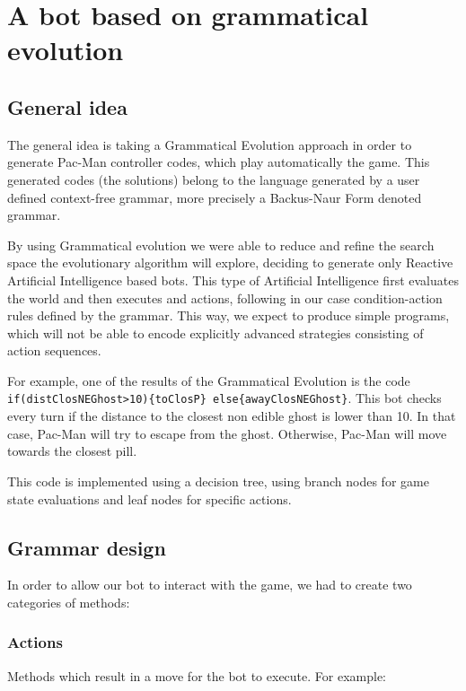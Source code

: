 \documentclass{llncs}
\newcommand{\paco}{Pac-Man }
\begin{document}
%
\section{A bot based on grammatical evolution}
\label{sec:sec1}
%

\subsection{General idea}

The general idea is taking a Grammatical Evolution approach in order to generate \paco controller codes, which play automatically the game. This generated codes (the solutions) belong to the language generated by a user defined context-free grammar, more precisely a Backus-Naur Form denoted grammar.\cite{o'neill_ryan_2012} 

By using Grammatical evolution we were able to reduce and refine the search space the evolutionary algorithm will explore, deciding to generate only Reactive Artificial Intelligence based bots. This type of Artificial Intelligence first evaluates the world and then executes and actions, following in our case condition-action rules defined by the grammar. This way, we expect to produce simple programs, which will not be able to encode explicitly advanced strategies consisting of action sequences.

For example, one of the results of the Grammatical Evolution is the code \texttt{if(distClosNEGhost>10)\{toClosP\} else\{awayClosNEGhost\}}. This bot checks every turn if the distance to the closest non edible ghost is lower than 10. In that case, \paco will try to escape from the ghost. Otherwise, \paco will move towards the closest pill.

This code is implemented using a decision tree, using branch nodes for game state evaluations and leaf nodes for specific actions.


\subsection{Grammar design}

In order to allow our bot to interact with the game, we had to create two categories of methods:

\subsubsection{Actions}
Methods which result in a move for the bot to execute. For example:\newline
\end{document}
